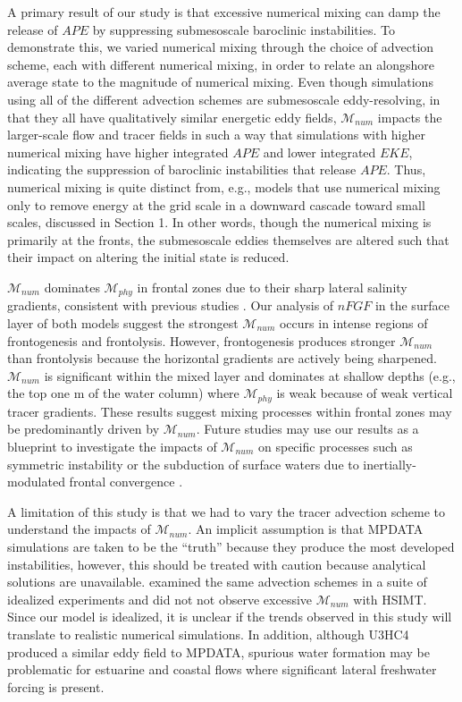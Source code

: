A primary result of our study is that excessive numerical mixing can damp the release of $APE$ by suppressing submesoscale baroclinic instabilities. To demonstrate this, we varied numerical mixing through the choice of advection scheme, each with different numerical mixing, in order to relate an alongshore average state to the magnitude of numerical mixing. Even though simulations using all of the different advection schemes are submesoscale eddy-resolving, in that they all have qualitatively similar energetic eddy fields, $\mathcal{M}_{num}$ impacts the larger-scale flow and tracer fields in such a way that simulations with higher numerical mixing have higher integrated $APE$ and lower integrated $EKE$, indicating the suppression of baroclinic instabilities that release $APE$. Thus, numerical mixing is quite distinct from, e.g., models that use numerical mixing only to remove energy at the grid scale in a downward cascade toward small scales, discussed in Section 1. In other words, though the numerical mixing is primarily at the fronts, the submesoscale eddies themselves are altered such that their impact on altering the initial state is reduced.

$\mathcal{M}_{num}$ dominates $\mathcal{M}_{phy}$ in frontal zones due to their sharp lateral salinity gradients, consistent with previous studies \citep{Kalra_2019, Holmes_2021, Ralston_2017, Wang_2021}. Our analysis of $nFGF$ in the surface layer of both models suggest the strongest $\mathcal{M}_{num}$ occurs in intense regions of frontogenesis and frontolysis. However, frontogenesis produces stronger $\mathcal{M}_{num}$ than frontolysis because the horizontal gradients are actively being sharpened. $\mathcal{M}_{num}$ is significant within the mixed layer and dominates at shallow depths (e.g., the top one m of the water column) where $\mathcal{M}_{phy}$ is weak because of weak vertical tracer gradients. These results suggest mixing processes within frontal zones may be predominantly driven by $\mathcal{M}_{num}$. Future studies may use our results as a blueprint to investigate the impacts of $\mathcal{M}_{num}$ on specific processes such as symmetric instability \citep{dong2021scale} or the subduction of surface waters due to inertially-modulated frontal convergence \citep{qu2022rapid}.

A limitation of this study is that we had to vary the tracer advection scheme to understand the impacts of $\mathcal{M}_{num}$. An implicit assumption is that MPDATA simulations are taken to be the ``truth'' because they produce the most developed instabilities, however, this should be treated with caution because analytical solutions are unavailable. \citet{Kalra_2019} examined the same advection schemes in a suite of idealized experiments and did not not observe excessive $\mathcal{M}_{num}$ with HSIMT. Since our model is idealized, it is unclear if the trends observed in this study will translate to realistic numerical simulations. In addition, although U3HC4 produced a similar eddy field to MPDATA, spurious water formation may be problematic for estuarine and coastal flows where significant lateral freshwater forcing is present. 

